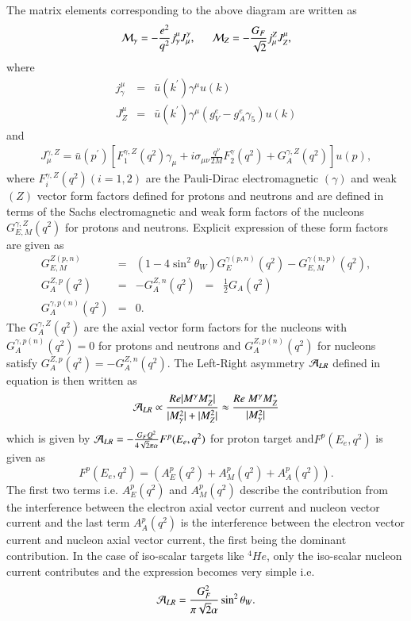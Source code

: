 The matrix elements corresponding to the above diagram are  written as 
\begin{eqnarray}
{\cal M}_\gamma= -\frac{e^2}{q^2}j^\mu_\gamma J_\mu^\gamma, ~~~~~~ {\cal M}_{Z}= -\frac{G_F}{\sqrt{2}}j_\mu^Z J^\mu_Z, \label{chap9-eq17}
\end{eqnarray}
where
\begin{eqnarray}
j^\mu_\gamma&=& \bar{u}(k^\prime)\gamma^\mu u(k) \label{chap9-eq18}\\
J^\mu_Z &=& \bar{u}(k^\prime)\gamma^\mu (g_V^e-g_A^e\gamma_5)u(k) \label{chap9-eq19}
\end{eqnarray}
and 
\begin{eqnarray}
J^{\gamma,Z}_\mu = \bar{u}(p^\prime)[F_1^{\gamma,Z}(q^2)\gamma_\mu+i\sigma_{\mu\nu}\frac{q^\nu}{2M}F_2^\gamma(q^2)+G_A^{\gamma,Z}(q^2)]u(p), \label{chap9-eq20}
\end{eqnarray}
where $F_i^{\gamma,Z}(q^2)(i=1,2)$ are the Pauli-Dirac electromagnetic $(\gamma)$ and weak $(Z)$ vector form factors defined for protons and neutrons and are defined in terms of the Sachs electromagnetic and weak form factors of the nucleons $G^{\gamma,Z}_{E,M}(q^2)$ for protons and neutrons. Explicit expression of these form factors are given as
\begin{eqnarray}
 G_{E,M}^{Z(p,n)}&=&(1-4\sin^2 \theta_W)G_{E}^{\gamma(p,n)}(q^2)-G_{E,M}^{\gamma(n,p)} (q^2), \label{chap9-eq21}\\
 G_A^{Z,p}(q^2)&=&-G_A^{Z,n}(q^2) \;\; = \;\; \frac{1}{2}G_A(q^2) \label{chap9-eq22}\\ 
 G_A^{\gamma,p(n)}(q^2)&=& 0 .  \label{chap9-eq23}
\end{eqnarray}
The $G^{\gamma,Z}_A(q^2)$ are the axial vector form factors for the nucleons with $G^{\gamma,p(n)}_A(q^2)=0$ for protons and neutrons and $G_{A}^{{Z,p(n)}}(q^2)$ for nucleons satisfy $G^{Z,p}_A(q^2)=-G^{Z,n}_A(q^2)$. The Left-Right asymmetry ${\cal A}_{LR}$ defined in equation is then written as 
\begin{equation}
 {\cal A}_{LR}\propto \frac{Re|M^\gamma M_Z^*|}{|M_\gamma^2|+|M_Z^2|} \approx \frac{Re~ M^\gamma M_Z^*}{|M_\gamma^2|} \label{chap9-eq24}
\end{equation}
 which is given by ${\cal A}_{LR}=-\frac{G_F Q^2}{4\sqrt{2}\pi\alpha}F^p(E_e,q^2)$ for proton target and\break $F^p(E_e,q^2)$ is given as\cite{chap9-key16}
 \begin{equation}
F^p(E_e,q^2)= (A^{p}_E(q^2) +A_M^{p}(q^2)+A_A^p(q^2)). \label{chap9-eq25}
 \end{equation}
The first two terms i.e. $A^{p}_E(q^2)$ and $A_M^{p}(q^2)$ describe the contribution from the interference between the electron axial vector current and nucleon vector current and the last term $A_A^p(q^2)$ is the interference between the electron vector current and nucleon axial vector current, the first being the dominant contribution. In the case of  iso-scalar targets like $^4{He}$, only the iso-scalar nucleon current contributes and the expression becomes very simple i.e. 
\begin{equation}
 {\cal A}_{LR} = \frac{G_F^2}{\pi\sqrt{2}\alpha}\sin^2\theta_W. \label{chap9-eq26}
\end{equation}

